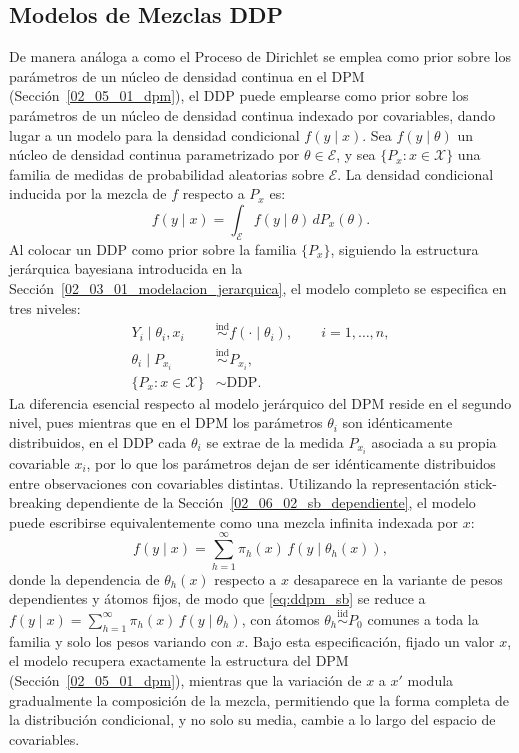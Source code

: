 \subsection{Modelos de Mezclas DDP}
\label{02_06_03_mezclas_ddp}
De manera análoga a como el Proceso de Dirichlet se emplea como prior sobre los parámetros de un núcleo de densidad continua en el DPM (Sección~\ref{02_05_01_dpm}), el DDP puede emplearse como prior sobre los parámetros de un núcleo de densidad continua indexado por covariables, dando lugar a un modelo para la densidad condicional $f(y \mid x)$. Sea $f(y \mid \theta)$ un núcleo de densidad continua parametrizado por $\theta \in \mathcal{E}$, y sea $\{P_x : x \in \mathcal{X}\}$ una familia de medidas de probabilidad aleatorias sobre $\mathcal{E}$. La densidad condicional inducida por la mezcla de $f$ respecto a $P_x$ es:
\begin{equation}
    f(y \mid x) = \int_{\mathcal{E}} f(y \mid \theta)\, dP_x(\theta).
\end{equation}
Al colocar un DDP como prior sobre la familia $\{P_x\}$, siguiendo la estructura jerárquica bayesiana introducida en la Sección~\ref{02_03_01_modelacion_jerarquica}, el modelo completo se especifica en tres niveles:
\begin{equation}\label{eq:ddpm_jerarquico}
\begin{aligned}
    Y_i \mid \theta_i, x_i &\overset{\mathrm{ind}}{\sim} f(\cdot \mid \theta_i),
    \qquad i = 1, \dots, n, \\
    \theta_i \mid P_{x_i} &\overset{\mathrm{ind}}{\sim} P_{x_i}, \\
    \{P_x : x \in \mathcal{X}\} &\sim \mathrm{DDP}.
\end{aligned}
\end{equation}
La diferencia esencial respecto al modelo jerárquico del DPM reside en el segundo nivel, pues mientras que en el DPM los parámetros $\theta_i$ son idénticamente distribuidos, en el DDP cada $\theta_i$ se extrae de la medida $P_{x_i}$ asociada a su propia covariable $x_i$, por lo que los parámetros dejan de ser idénticamente distribuidos entre observaciones con covariables distintas. Utilizando la representación stick-breaking dependiente de la Sección~\ref{02_06_02_sb_dependiente}, el modelo puede escribirse equivalentemente como una mezcla infinita indexada por $x$:
\begin{equation}\label{eq:ddpm_sb}
    f(y \mid x) = \sum_{h=1}^{\infty} \pi_h(x)\, f(y \mid \theta_h(x)),
\end{equation}
donde la dependencia de $\theta_h(x)$ respecto a $x$ desaparece en la variante de pesos dependientes y átomos fijos, de modo que \eqref{eq:ddpm_sb} se reduce a $f(y \mid x) = \sum_{h=1}^{\infty} \pi_h(x)\, f(y \mid \theta_h)$, con átomos $\theta_h \overset{\mathrm{iid}}{\sim} P_0$ comunes a toda la familia y solo los pesos variando con $x$. Bajo esta especificación, fijado un valor $x$, el modelo recupera exactamente la estructura del DPM (Sección~\ref{02_05_01_dpm}), mientras que la variación de $x$ a $x'$ modula gradualmente la composición de la mezcla, permitiendo que la forma completa de la distribución condicional, y no solo su media, cambie a lo largo del espacio de covariables.



